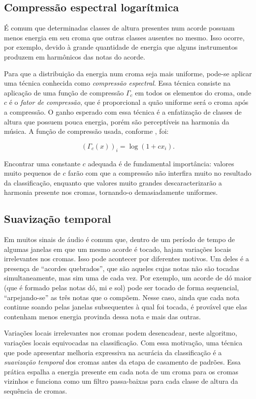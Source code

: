    
    \subsection{Compressão espectral logarítmica}
        É comum que determinadas classes de altura presentes num acorde possuam menos energia em seu croma que outras classes ausentes no mesmo. Isso ocorre, por exemplo, devido à grande quantidade de energia que alguns instrumentos produzem em harmônicos das notas do acorde.
        
        Para que a distribuição da energia num croma seja mais uniforme, pode-se aplicar uma técnica conhecida como \textit{compressão espectral}. Essa técnica consiste na aplicação de uma função de compressão $\Gamma_c$ em todos os elementos do croma, onde $c$ é o \textit{fator de compressão}, que é proporcional a quão uniforme será o croma após a compressão. O ganho esperado com essa técnica é a enfatização de classes de altura que possuem pouca energia, porém são perceptíveis na harmonia da música.
        A função de compressão usada, conforme \cite{muller}, foi:

        \[
            (\Gamma_c(x))_i = \log(1 + cx_i)\mbox{.}
        \]

        Encontrar uma constante $c$ adequada é de fundamental importância: valores muito pequenos de $c$ farão com que a compressão não interfira muito no resultado da classificação, enquanto que valores muito grandes descaracterizarão a harmonia presente nos cromas, tornando-o demasiadamente uniformes.

    \subsection{Suavização temporal}
        Em muitos sinais de áudio é comum que, dentro de um período de tempo de algumas janelas em que um mesmo acorde é tocado, hajam variações locais irrelevantes nos cromas.
        Isso pode acontecer por diferentes motivos. Um deles é a presença de ``acordes quebrados'', que são aqueles cujas notas não são tocadas simultaneamente, mas sim uma de cada vez. Por exemplo, um acorde de dó maior (que é formado pelas notas dó, mi e sol) pode ser tocado de forma sequencial, ``arpejando-se'' as três notas que o compõem. Nesse caso, ainda que cada nota continue soando pelas janelas subsequentes à qual foi tocada, é provável que elas contenham menos energia provinda dessa nota e mais das outras.
        
        Variações locais irrelevantes nos cromas podem desencadear, neste algoritmo, variações locais equivocadas na classificação.
        Com essa motivação, uma técnica que pode apresentar melhoria expressiva na acurácia da classificação é a \textit{suavização temporal} dos cromas antes da etapa de casamento de padrões. Essa prática espalha a energia presente em cada nota de um croma para os cromas vizinhos e funciona como um filtro passa-baixas para cada classe de altura da sequência de cromas.
        
